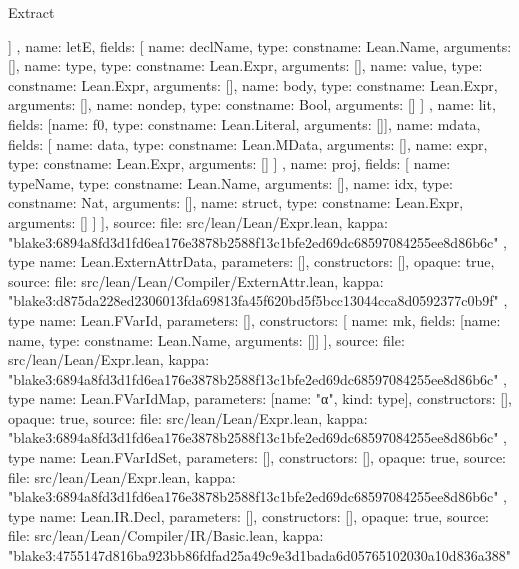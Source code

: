 \begin{lexlean}{Extract}
\begin{toolingmodule}
{{{          ]
        },
        {
          name: letE,
          fields: [
            {name: declName, type: const{name: Lean.Name, arguments: []}},
            {name: type, type: const{name: Lean.Expr, arguments: []}},
            {name: value, type: const{name: Lean.Expr, arguments: []}},
            {name: body, type: const{name: Lean.Expr, arguments: []}},
            {name: nondep, type: const{name: Bool, arguments: []}}
          ]
        },
        {name: lit, fields: [{name: f0, type: const{name: Lean.Literal, arguments: []}}]},
        {
          name: mdata,
          fields: [
            {name: data, type: const{name: Lean.MData, arguments: []}},
            {name: expr, type: const{name: Lean.Expr, arguments: []}}
          ]
        },
        {
          name: proj,
          fields: [
            {name: typeName, type: const{name: Lean.Name, arguments: []}},
            {name: idx, type: const{name: Nat, arguments: []}},
            {name: struct, type: const{name: Lean.Expr, arguments: []}}
          ]
        }
      ],
      source: {
        file: src/lean/Lean/Expr.lean,
        kappa: "blake3:6894a8fd3d1fd6ea176e3878b2588f13c1bfe2ed69dc68597084255ee8d86b6c"
      }
    },
    type{
      name: Lean.ExternAttrData,
      parameters: [],
      constructors: [],
      opaque: true,
      source: {
        file: src/lean/Lean/Compiler/ExternAttr.lean,
        kappa: "blake3:d875da228ed2306013fda69813fa45f620bd5f5bcc13044cca8d0592377c0b9f"
      }
    },
    type{
      name: Lean.FVarId,
      parameters: [],
      constructors: [
        {name: mk, fields: [{name: name, type: const{name: Lean.Name, arguments: []}}]}
      ],
      source: {
        file: src/lean/Lean/Expr.lean,
        kappa: "blake3:6894a8fd3d1fd6ea176e3878b2588f13c1bfe2ed69dc68597084255ee8d86b6c"
      }
    },
    type{
      name: Lean.FVarIdMap,
      parameters: [{name: "α", kind: type{}}],
      constructors: [],
      opaque: true,
      source: {
        file: src/lean/Lean/Expr.lean,
        kappa: "blake3:6894a8fd3d1fd6ea176e3878b2588f13c1bfe2ed69dc68597084255ee8d86b6c"
      }
    },
    type{
      name: Lean.FVarIdSet,
      parameters: [],
      constructors: [],
      opaque: true,
      source: {
        file: src/lean/Lean/Expr.lean,
        kappa: "blake3:6894a8fd3d1fd6ea176e3878b2588f13c1bfe2ed69dc68597084255ee8d86b6c"
      }
    },
    type{
      name: Lean.IR.Decl,
      parameters: [],
      constructors: [],
      opaque: true,
      source: {
        file: src/lean/Lean/Compiler/IR/Basic.lean,
        kappa: "blake3:4755147d816ba923bb86fdfad25a49c9e3d1bada6d05765102030a10d836a388"
}}}
\end{toolingmodule}
\end{lexlean}
